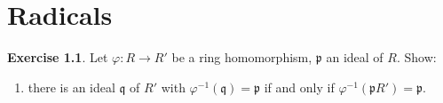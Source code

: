 \documentclass{book}
\theoremstyle{plain}
\theoremstyle{definition}
\newtheorem{exr}[thm]{Exercise}
\theoremstyle{custom_definition}
\begin{document}
\chapter{Radicals}

\begin{exr}%
  Let \(\varphi: R \longrightarrow R'\) be a ring homomorphism, \(\mathfrak{p}\) an ideal of \(R\). Show:
  \begin{enumerate}
    \item there is an ideal \(\mathfrak{q}\) of \(R'\) with \(\varphi^{-1}(\mathfrak{q}) = \mathfrak{p}\) if and only if \(\varphi^{-1}(\mathfrak{p}R') = \mathfrak{p}\).
  \end{enumerate}
\end{exr}
\end{document}
